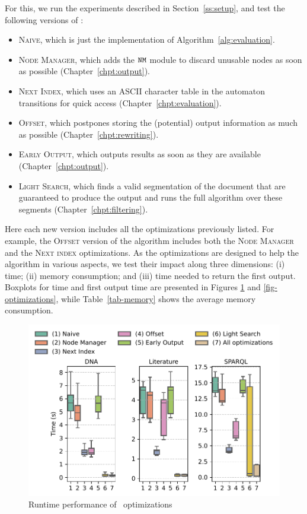 For this, we run the experiments described in Section~\ref{ss:setup}, and test
the following versions of \rematch:
\begin{itemize}
	\item \textsc{Naive}, which is just the implementation of
	Algorithm~\ref{alg:evaluation}.
	\item \textsc{Node Manager}, which adds the $\mathtt{NM}$ module to discard unusable
	nodes as soon as possible (Chapter~\ref{chpt:output}).
	\item \textsc{Next Index}, which uses an ASCII character table in the
	automaton transitions for quick access (Chapter~\ref{chpt:evaluation}).
	\item \textsc{Offset}, which postpones storing the (potential) output
	information as much as possible (Chapter~\ref{chpt:rewriting}).
	\item \textsc{Early Output}, which outputs results as soon as they are
	available (Chapter~\ref{chpt:output}).
	\item \textsc{Light Search}, which finds a valid segmentation of the
	document that are guaranteed to produce the output and runs the full
	algorithm over these segments (Chapter~\ref{chpt:filtering}).
\end{itemize}

Here each new version includes all the optimizations  previously listed. For
example, the \textsc{Offset} version of the algorithm includes both the
\textsc{Node Manager} and the \textsc{Next index} optimizations. As the
optimizations are designed to help the algorithm in various aspects, we test
their impact along three dimensions: (i) time; (ii) memory consumption; and
(iii) time needed to return the first output. Boxplots for time and first output
time are presented in Figures \ref{fig:opt-time} and \ref{fig-optimizations},
while Table~\ref{tab-memory} shows the average memory consumption.


\begin{figure}[t]
	\centering
	\centering
	\includegraphics[width=.8\textwidth]{figures/versions-time.pdf}
	\caption{Runtime performance of \rematch\ optimizations}
	\label{fig:opt-time}
\end{figure}


